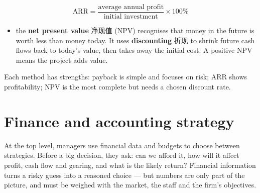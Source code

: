 \documentclass[11pt]{article}
\begin{document}
\[
\text{ARR} = \frac{\text{average annual profit}}{\text{initial investment}} \times 100\%
\]

\begin{itemize}
\item the \textbf{net present value} 净现值 (NPV) recognises that money in the future is worth less than money today. It uses \textbf{discounting} 折现 to shrink future cash flows back to today's value, then takes away the initial cost. A positive NPV means the project adds value.

\end{itemize}

Each method has strengths: payback is simple and focuses on risk; ARR shows profitability; NPV is the most complete but needs a chosen discount rate.

\section*{Finance and accounting strategy}

At the top level, managers use financial data and budgets to choose between strategies. Before a big decision, they ask: can we afford it, how will it affect profit, cash flow and gearing, and what is the likely return? Financial information turns a risky guess into a reasoned choice — but numbers are only part of the picture, and must be weighed with the market, the staff and the firm's objectives.
\end{document}
